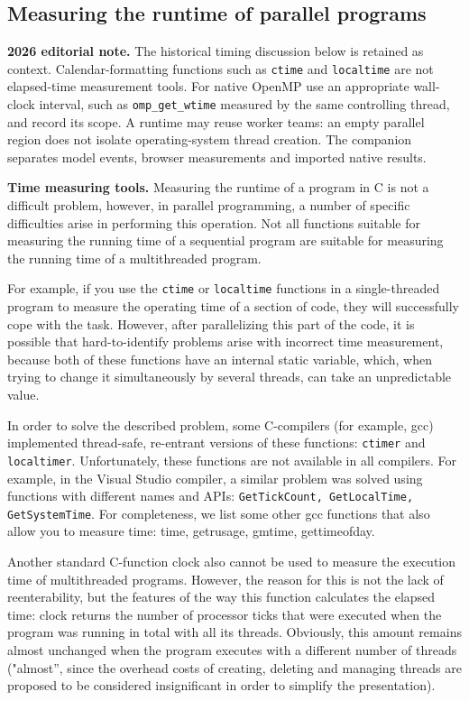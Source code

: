{ %
	\subsection{Measuring the runtime of parallel programs}
	\par\textbf{2026 editorial note.} The historical timing discussion below is retained as context. Calendar-formatting functions such as \texttt{ctime} and \texttt{localtime} are not elapsed-time measurement tools. For native OpenMP use an appropriate wall-clock interval, such as \texttt{omp\_get\_wtime} measured by the same controlling thread, and record its scope. A runtime may reuse worker teams: an empty parallel region does not isolate operating-system thread creation. The companion separates model events, browser measurements and imported native results.
	\par\textbf{Time measuring tools.} Measuring the runtime of a program in C is not a difficult problem, however, in parallel programming, a number of specific difficulties arise in performing this operation. Not all functions suitable for measuring the running time of a sequential program are suitable for measuring the running time of a multithreaded program.
	\par For example, if you use the \texttt{ctime} or \texttt{localtime} functions in a single-threaded program to measure the operating time of a section of code, they will successfully cope with the task. However, after parallelizing this part of the code, it is possible that hard-to-identify problems arise with incorrect time measurement, because both of these functions have an internal static variable, which, when trying to change it simultaneously by several threads, can take an unpredictable value.
	\par In order to solve the described problem, some C-compilers (for example, gcc) implemented thread-safe, re-entrant versions of these functions: \texttt{ctime\textunderscore r} and \texttt{localtime\textunderscore r}. Unfortunately, these functions are not available in all compilers. For example, in the Visual Studio compiler, a similar problem was solved using functions with different names and APIs: \texttt{GetTickCount, GetLocalTime, GetSystemTime}. For completeness, we list some other gcc functions that also allow you to measure time: time, getrusage, gmtime, gettimeofday.
	\par Another standard C-function clock also cannot be used to measure the execution time of multithreaded programs. However, the reason for this is not the lack of reenterability, but the features of the way this function calculates the elapsed time: clock returns the number of processor ticks that were executed when the program was running in total with all its threads. Obviously, this amount remains almost unchanged when the program executes with a different number of threads ("almost'', since the overhead costs of creating, deleting and managing threads are proposed to be considered insignificant in order to simplify the presentation).
}
